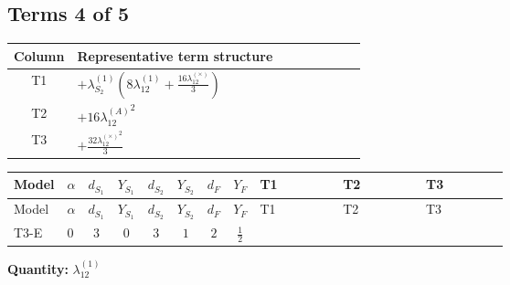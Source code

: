 \documentclass[8pt]{article}
\begin{document}
\begin{landscape}
\subsection*{Terms 4 of 5}
\begin{center}
\begin{tabular}{@{}c >{\raggedright\arraybackslash}p{0.82\linewidth}@{}}
\toprule
Column & Representative term structure \\
\midrule
T1 & \(\displaystyle +{\lambda_{S_2}^{(1)}} \left(8 {\lambda_{12}^{(1)}}+\frac{16 {\lambda_{12}^{(\times)}}}{3}\right)\) \\
\midrule
T2 & \(\displaystyle +16 {\lambda_{12}^{(A)}}^2\) \\
\midrule
T3 & \(\displaystyle +\frac{32 {\lambda_{12}^{(\times)}}^2}{3}\) \\
\midrule
\bottomrule
\end{tabular}
\end{center}
\smallskip
\tiny
\begin{longtable}{@{}llcccccc >{\raggedright\arraybackslash}p{0.21\linewidth} >{\raggedright\arraybackslash}p{0.21\linewidth} >{\raggedright\arraybackslash}p{0.21\linewidth}@{}}
\toprule
Model & $\alpha$ & $d_{S_1}$ & $Y_{S_1}$ & $d_{S_2}$ & $Y_{S_2}$ & $d_F$ & $Y_F$ & T1 & T2 & T3 \\
\midrule
\endfirsthead
\toprule
Model & $\alpha$ & $d_{S_1}$ & $Y_{S_1}$ & $d_{S_2}$ & $Y_{S_2}$ & $d_F$ & $Y_F$ & T1 & T2 & T3 \\
\midrule
\endhead
T3-E & $0$ & $3$ & $0$ & $3$ & $1$ & $2$ & $\frac{1}{2}$ & \scriptsize\adjustbox{max width=\linewidth}{$\begin{gathered} +{\lambda_{S_2}^{(1)}} \left(8 {\lambda_{12}^{(1)}}+\frac{16 {\lambda_{12}^{(\times)}}}{3}\right)\end{gathered}$} & \scriptsize\adjustbox{max width=\linewidth}{$\begin{gathered} +16 {\lambda_{12}^{(A)}}^2\end{gathered}$} & \scriptsize\adjustbox{max width=\linewidth}{$\begin{gathered} +\frac{32 {\lambda_{12}^{(\times)}}^2}{3}\end{gathered}$} \\
\midrule
\bottomrule
\end{longtable}
\clearpage
\noindent\textbf{Quantity: }$\lambda_{12}^{(1)}$\par\smallskip

\end{landscape}
\end{document}
